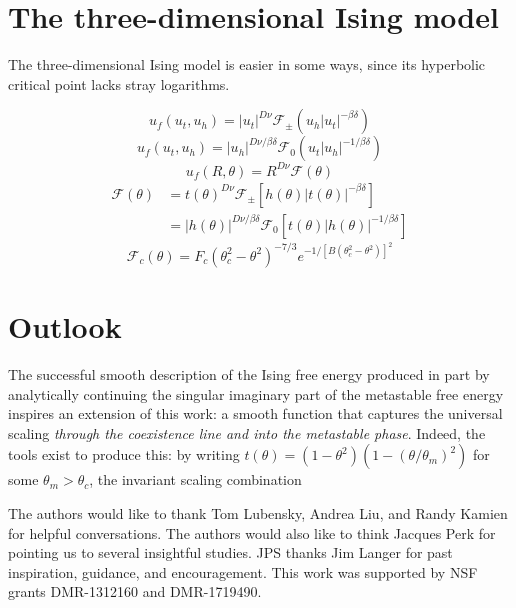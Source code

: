 \documentclass[
  aps,
  pre,
  preprint,
  longbibliography,
  floatfix
]{revtex4-2}
\begin{document}
\section{The three-dimensional Ising model}

\cite{Butera_2011_Free}

The three-dimensional Ising model is easier in some ways, since its hyperbolic critical point lacks stray logarithms.

\begin{equation} \label{eq:free.energy.3d.low}
  u_f(u_t, u_h)
  = |u_t|^{D\nu}\mathcal F_{\pm}(u_h|u_t|^{-\beta\delta})
\end{equation}
\begin{equation} \label{eq:free.energy.3d.mid}
  u_f(u_t, u_h)
  = |u_h|^{D\nu/\beta\delta}\mathcal F_0(u_t|u_h|^{-1/\beta\delta})
\end{equation}
\begin{equation} \label{eq:schofield.3d.free.energy}
  u_f(R, \theta) = R^{D\nu}\mathcal F(\theta)
\end{equation}
\begin{equation} \label{eq:scaling.function.equivalences.3d}
  \begin{aligned}
    \mathcal F(\theta)
    &=t(\theta)^{D\nu}\mathcal F_\pm\left[h(\theta)|t(\theta)|^{-\beta\delta}\right] \\
    &=|h(\theta)|^{D\nu/\beta\delta}\mathcal F_0\left[t(\theta)|h(\theta)|^{-1/\beta\delta}\right]
  \end{aligned}
\end{equation}
\begin{equation}
  \mathcal F_c(\theta)=F_c(\theta_c^2-\theta^2)^{-7/3}e^{-1/[B(\theta_c^2-\theta^2)]^2}
\end{equation}

\section{Outlook}

The successful smooth description of the Ising free energy produced in part by analytically continuing the singular imaginary part of the metastable free energy inspires an extension of this work: a smooth function that captures the universal scaling \emph{through the coexistence line and into the metastable phase}. Indeed, the tools exist to produce this: by writing $t(\theta)=(1-\theta^2)(1-(\theta/\theta_m)^2)$ for some $\theta_m>\theta_c$, the invariant scaling combination

\begin{acknowledgments}
  The authors would like to thank Tom Lubensky, Andrea Liu, and Randy Kamien
  for helpful conversations. The authors would also like to think Jacques Perk
  for pointing us to several insightful studies. JPS thanks Jim Langer for past
  inspiration, guidance, and encouragement. This work was supported by NSF
  grants DMR-1312160 and DMR-1719490.
\end{acknowledgments}


\end{document}

